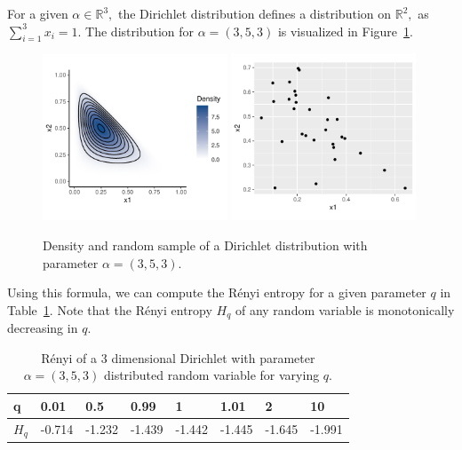 \documentclass[12pt, twoside]{article}
\newcommand{\R}{\mathbb{R}}
\newcommand{\1}{\mathbb{1}}
\begin{document}
For a given $\alpha \in \R^3,$ the Dirichlet distribution defines a distribution on $\R^2,$ as $\sum_{i = 1}^3 x_i = 1$. The distribution for $\alpha = (3, 5, 3)$ is visualized in Figure~\ref{fig:dir_dist}.
\begin{figure}[ht]
    \centering
    \includegraphics[width=0.49\textwidth]{plots/dirichlet_density.pdf}
    \includegraphics[width=0.49\textwidth]{plots/dirichlet_sample.pdf}
    \caption{Density and random sample of a Dirichlet distribution with parameter $\alpha = (3, 5, 3)$.}
    \label{fig:dir_dist}
\end{figure}


Using this formula, we can compute the R\'enyi entropy for a given parameter $q$ in Table~\ref{tab:renyi_ent}. Note that the R\'enyi entropy $H_q$ of any random variable is monotonically decreasing in $q$.

\begin{table}[ht]
\caption{R\'enyi of a 3 dimensional Dirichlet with parameter $\alpha = (3, 5, 3)$ distributed random variable for varying $q$. }
\begin{tabular}{l|lllllll}
q    & 0.01   & 0.5    & 0.99                       & 1      & 1.01   & 2      & 10     \\ \hline
$H_q$ & -0.714 & -1.232 & \multicolumn{1}{r}{-1.439} & -1.442 & -1.445 & -1.645 & -1.991
\end{tabular}
\label{tab:renyi_ent}
\end{table}
\end{document}
